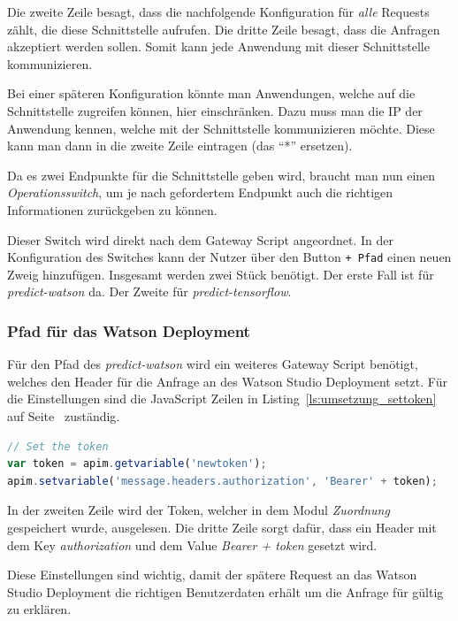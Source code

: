 Die zweite Zeile besagt, dass die nachfolgende Konfiguration für \textit{alle} Requests zählt, die diese Schnittstelle
aufrufen. Die dritte Zeile besagt, dass die Anfragen akzeptiert werden sollen. Somit kann jede Anwendung mit dieser
Schnittstelle kommunizieren.

Bei einer späteren Konfiguration könnte man Anwendungen, welche auf die Schnittstelle zugreifen können, hier
einschränken. Dazu muss man die IP der Anwendung kennen, welche mit der Schnittstelle kommunizieren möchte. Diese kann
man dann in die zweite Zeile eintragen (das \enquote{*} ersetzen).

Da es zwei Endpunkte für die Schnittstelle geben wird, braucht man nun einen \textit{Operationsswitch}, um je nach
gefordertem Endpunkt auch die richtigen Informationen zurückgeben zu können.

Dieser Switch wird direkt nach dem Gateway Script angeordnet. In der Konfiguration des Switches kann der Nutzer über den
Button \texttt{+ Pfad} einen neuen Zweig hinzufügen. Insgesamt werden zwei Stück benötigt. Der erste Fall ist für
\textit{predict-watson} da. Der Zweite für \textit{predict-tensorflow}.

\subsubsection*{Pfad für das Watson Deployment}
Für den Pfad des \textit{predict-watson} wird ein weiteres Gateway Script benötigt, welches den Header für die Anfrage
an des Watson Studio Deployment setzt. Für die Einstellungen sind die JavaScript Zeilen in
Listing~\ref{ls:umsetzung_settoken} auf Seite~\pageref{ls:umsetzung_settoken} zuständig.

\begin{lstlisting}[language=JavaScript, caption=Gateway Script für den Authorization-Token, label=ls:umsetzung_settoken]
// Set the token
var token = apim.getvariable('newtoken');
apim.setvariable('message.headers.authorization', 'Bearer' + token);
\end{lstlisting}

In der zweiten Zeile wird der Token, welcher in dem Modul \textit{Zuordnung} gespeichert wurde, ausgelesen. Die dritte
Zeile sorgt dafür, dass ein Header mit dem Key \textit{authorization} und dem Value \textit{Bearer + token} gesetzt wird.

Diese Einstellungen sind wichtig, damit der spätere Request an das Watson Studio Deployment die richtigen Benutzerdaten
erhält um die Anfrage für gültig zu erklären.

